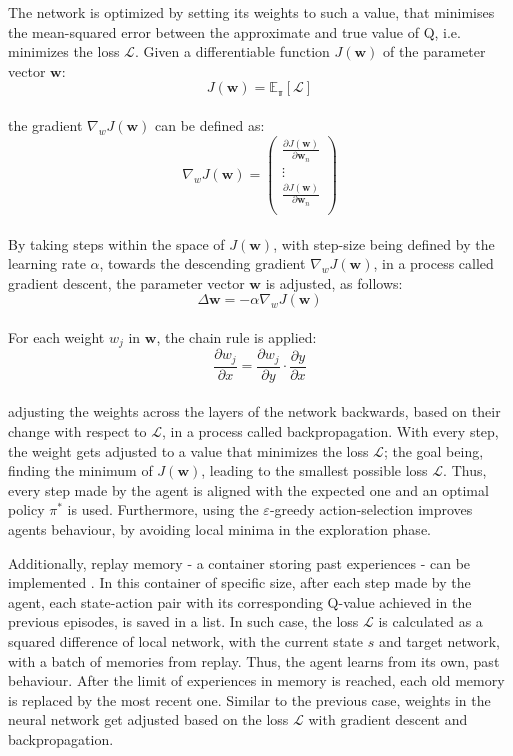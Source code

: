 \documentclass{article}
\begin{document}
The network is optimized by setting its weights  to such a value, that minimises the mean-squared error between the approximate and true value of Q, i.e. minimizes the loss $\mathcal{L}$. Given a differentiable function $J(\textbf{w})$ of the parameter vector $\textbf{w}$:
\begin{equation}
    J(\textbf{w}) = \mathbb{E_\pi[\mathcal{L}]}
\end{equation}
\\
the gradient $\nabla_wJ(\textbf{w})$ can be defined as:
\begin{equation}
    \nabla_w J(\textbf{w}) =
    \begin{pmatrix}
        \frac{\partial J(\textbf{w})}{\partial \textbf{w}_n}  \\
        \vdots  \\
        \frac{\partial J(\textbf{w})}{\partial \textbf{w}_n}  \\
    \end{pmatrix}
\end{equation}
\\
By taking steps within the space of $J(\textbf{w})$, with step-size being defined by the learning rate $\alpha$, towards the descending gradient $\nabla_{w}J(\textbf{w})$, in a process called gradient descent, the parameter vector $\textbf{w}$ is adjusted, as follows:
\begin{equation}
    \Delta\textbf{w} = -\alpha\nabla_{w}J(\textbf{w})
\end{equation}
\\
For each weight $w_j$ in $\textbf{w}$, the chain rule is applied:
\begin{equation}
    \frac{\partial w_j}{\partial x}
    = \frac{\partial w_j}{\partial y}\cdot\frac{\partial y}{\partial x}
\end{equation}
\\
adjusting the weights across the layers of the network backwards, based on their change with respect to $\mathcal{L}$, in a process called backpropagation. With every step, the weight gets adjusted to a value that minimizes the loss $\mathcal{L}$; the goal being, finding the minimum of $J(\textbf{w})$, leading to the smallest possible loss $\mathcal{L}$. Thus, every step made by the agent is aligned with the expected one and an optimal policy $\pi^*$ is used. Furthermore, using the $\varepsilon$-greedy action-selection improves agents behaviour, by avoiding local minima in the exploration phase.

Additionally, replay memory - a container storing past experiences - can be implemented \cite{liu2018effects}. In this container of specific size, after each step made by the agent, each state-action pair with its corresponding Q-value achieved in the previous episodes, is saved in a list. In such case, the loss $\mathcal{L}$ is calculated as a squared difference of local network, with the current state $s$ and target network, with a batch of memories from replay. Thus, the agent learns from its own, past behaviour. After the limit of experiences in memory is reached, each old memory is replaced by the most recent one. Similar to the previous case, weights in the neural network get adjusted based on the loss $\mathcal{L}$ with gradient descent and backpropagation.
\end{document}
